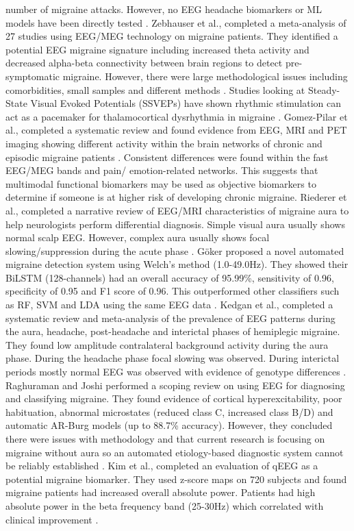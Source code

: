 \documentclass[12pt, a4paper]{report}
\begin{document}
number of migraine attacks. However, no EEG headache biomarkers or ML models have been directly tested \cite{Quartetti2025}. Zebhauser et al., completed a meta-analysis of 27 studies using EEG/MEG technology on migraine patients. They identified a potential EEG migraine signature including increased theta activity and decreased alpha-beta connectivity between brain regions to detect pre-symptomatic migraine. However, there were large methodological issues including comorbidities, small samples and different methods  \cite{Zebhauser2024}. Studies looking at Steady-State Visual Evoked Potentials (SSVEPs) have shown rhythmic stimulation can act as a pacemaker for thalamocortical dysrhythmia in migraine  \cite{AbdulhusseinAldeen2024}. Gomez-Pilar et al., completed a systematic review and found evidence from EEG, MRI and PET imaging showing different activity within the brain networks of chronic and episodic migraine patients  \cite{GomezPilar2022}. Consistent differences were found within the fast EEG/MEG bands and pain/ emotion-related networks. This suggests that multimodal functional biomarkers may be used as objective biomarkers to determine if someone is at higher risk of developing chronic migraine. Riederer et al., completed a narrative review of EEG/MRI characteristics of migraine aura to help neurologists perform differential diagnosis. Simple visual aura usually shows normal scalp EEG. However, complex aura usually shows focal slowing/suppression during the acute phase  \cite{Riederer2023}. Göker proposed a novel automated migraine detection system using Welch’s method (1.0-49.0Hz). They showed their BiLSTM (128-channels) had an overall accuracy of 95.99\%, sensitivity of 0.96, specificity of 0.95 and F1 score of 0.96. This outperformed other classifiers such as RF, SVM and LDA using the same EEG data  \cite{Goker2023}. Kedgan et al., completed a systematic review and meta-analysis of the prevalence of EEG patterns during the aura, headache, post-headache and interictal phases of hemiplegic migraine. They found low amplitude contralateral background activity during the aura phase. During the headache phase focal slowing was observed. During interictal periods mostly normal EEG was observed with evidence of genotype differences  \cite{Kedgan2025}. Raghuraman and Joshi performed a scoping review on using EEG for diagnosing and classifying migraine. They found evidence of cortical hyperexcitability, poor habituation, abnormal microstates (reduced class C, increased class B/D) and automatic AR-Burg models (up to 88.7\% accuracy). However, they concluded there were issues with methodology and that current research is focusing on migraine without aura so an automated etiology-based diagnostic system cannot be reliably established  \cite{RaghuramanJoshi2024}. Kim et al., completed an evaluation of qEEG as a potential migraine biomarker. They used z-score maps on 720 subjects and found migraine patients had increased overall absolute power. Patients had high absolute power in the beta frequency band (25-30Hz) which correlated with clinical improvement  \cite{Kim2023}.
\end{document}
